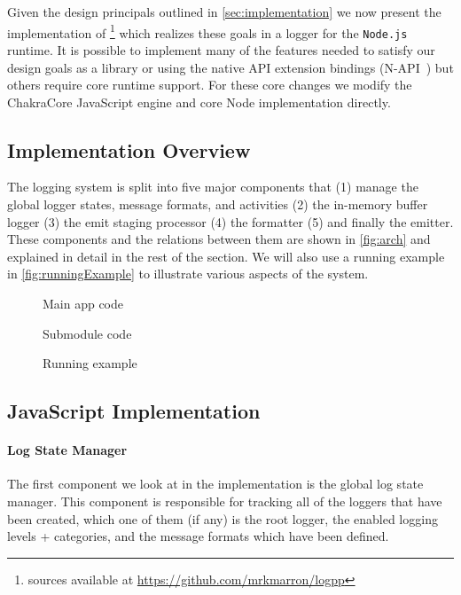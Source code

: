 Given the design principals outlined in \autoref{sec:implementation} we now 
present the implementation of \projn\footnote{\projn sources available at 
\url{https://github.com/mrkmarron/logpp}} which realizes these goals in a logger 
for the \texttt{Node.js}~\cite{Node} runtime. It is possible to implement many 
of the features needed to satisfy our design goals as a library or using the 
native API extension bindings (N-API~\cite{NAPI}) but others require core 
runtime support. For these core changes we modify the ChakraCore JavaScript 
engine and core Node implementation directly.

\subsection{Implementation Overview}
The logging system is split into five major components that (1) manage the 
global logger states, message formats, and activities (2) the in-memory buffer logger 
(3) the emit staging processor (4) the formatter (5) and finally the emitter. These 
components and the relations between them are shown in \autoref{fig:arch} and 
explained in detail in the rest of the section. We will also use a running 
example in \autoref{fig:runningExample} to illustrate various aspects of the 
system.

\begin{figure*}[t]
\begin{minipage}[b]{0.47\textwidth}
     
    \caption{Main app code}
    \label{fig:appmain}
\end{minipage}
\begin{minipage}[b]{0.47\textwidth}
    
    \caption{Submodule code}
    \label{fig:appsub}
\end{minipage}
\caption{Running example}
\label{fig:runningExample}
\end{figure*}

\subsection{JavaScript Implementation}
\label{subsec:jsimpl}
\paragraph{Log State Manager}
\noindent
The first component we look at in the implementation is the global log state 
manager. This component is responsible for tracking all of the loggers that 
have been created, which one of them (if any) is the root logger, the enabled logging levels + 
categories, and the message formats which have been defined. 

